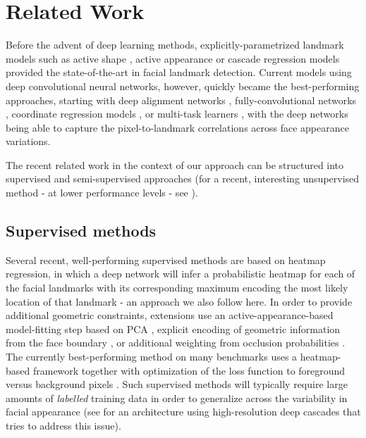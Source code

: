 \documentclass[10pt,twocolumn,letterpaper]{article}
\begin{document}
\vspace{-0.0cm}

\section{Related Work}\vspace{0.1cm}
Before the advent of deep learning methods, explicitly-parametrized landmark models such as active shape \cite{cootes1992active}, active appearance \cite{cootes1998active} or cascade regression models \cite{xiong2013supervised,feng2015cascaded} provided the state-of-the-art in facial landmark detection. Current models using deep convolutional neural networks, however, quickly became the best-performing approaches, starting with deep alignment networks \cite{sun2013deep}, fully-convolutional networks \cite{liang2015unconstrained}, coordinate regression models \cite{Lv2017,trigeorgis2016mnemonic}, or multi-task learners \cite{ranjan2017hyperface}, with the deep networks being able to capture the pixel-to-landmark correlations across face appearance variations.

The recent related work in the context of our approach can be structured into supervised and semi-supervised approaches (for a recent, interesting unsupervised method - at lower performance levels - see \cite{thewlis2019unsupervised}).

\subsection{Supervised methods}
Several recent, well-performing supervised methods are based on heatmap regression, in which a deep network will infer a probabilistic heatmap for each of the facial landmarks with its corresponding maximum encoding the most likely location of that landmark \cite{liang2015unconstrained,Bulat2016,deng2019joint} - an approach we also follow here. In order to provide additional geometric constraints, extensions use an active-appearance-based model-fitting step based on PCA \cite{Merget2018},  explicit encoding of geometric information from the face boundary \cite{Wu2018}, or additional weighting from occlusion probabilities \cite{Meilu2019}. The currently best-performing method on many benchmarks uses a heatmap-based framework together with optimization of the loss function to foreground versus background pixels  \cite{Wang2019}. Such supervised methods will typically require large amounts of {\em labelled} training data in order to generalize across the variability in facial appearance (see \cite{Dapogny2019} for an architecture using high-resolution deep cascades that tries to address this issue).
\end{document}
